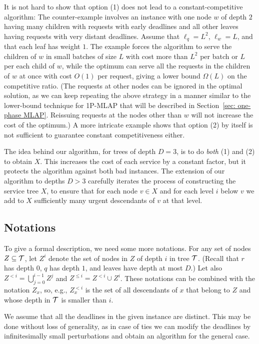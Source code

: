\documentclass[a4paper]{article}
\newcommand{\calT}{{\cal T}}
\newcommand{\length}{\ell}
\newcommand{\SPMLAP}{\mbox{\rm\textsf{1P-MLAP}}}
\begin{document}
It is not hard to show that option (1) does not lead to a
constant-competitive algorithm: The counter-example involves an
instance with one node $w$ of depth $2$ having many children with
requests with early deadlines and all other leaves having requests
with very distant deadlines. Assume that $\length_q=L^2$,
$\length_w=L$, and that each leaf has weight $1$. 
The example forces the
algorithm to serve the children of $w$ in small batches of size $L$
with cost more than $L^2$ per batch or $L$ per each child of $w$, while the
optimum can serve all the requests in the children of $w$ at once with cost $O(1)$ per
request, giving a lower bound $\Omega(L)$ on the competitive ratio.
(The requests at other nodes can be ignored in the optimal
solution, as we can keep repeating the above strategy in a manner
similar to the lower-bound technique for {\SPMLAP}
that will be described in Section~\ref{sec: one-phase MLAP}.
Reissuing requests at the 
nodes other than $w$ will not increase the cost of the optimum.) 
A more intricate example
shows that option (2) by itself is not sufficient to guarantee
constant competitiveness either.

The idea behind our algorithm, for trees of depth $D=3$, is to do 
\emph{both} (1) and (2) to obtain $X$. This increases the cost of each
service by a constant factor, but it protects the algorithm against
both bad instances. The extension of our algorithm to depths 
$D>3$ carefully iterates the
process of constructing the service tree $X$, to ensure that for each
node $v\in X$ and for each level $i$ below $v$ we add to $X$
sufficiently many urgent descendants of $v$ at that level.


\subsection{Notations}

To give a formal description, we need some more notations.
For any set of nodes $Z\subseteq\calT$, let $Z^i$ denote the set of
nodes in $Z$ of depth $i$ in tree $\calT$. (Recall
that $r$ has depth $0$, $q$ has depth $1$, and leaves have depth at
most $D$.) Let also $Z^{<i} =\bigcup_{j=0}^{i-1}Z^j$ and $Z^{\le i}
=Z^{<i}\cup Z^i$. These notations can be combined with the notation
$Z_x$, so, e.g., $Z_x^{<i}$ is the set of all descendants of $x$ that
belong to $Z$ and whose depth in $\calT$ is smaller than $i$.

We assume that all the deadlines in the given instance are
distinct. This may be done without loss of generality, as in case of
ties we can modify the deadlines by infinitesimally small
perturbations and obtain an algorithm for the general case. 
\end{document}
